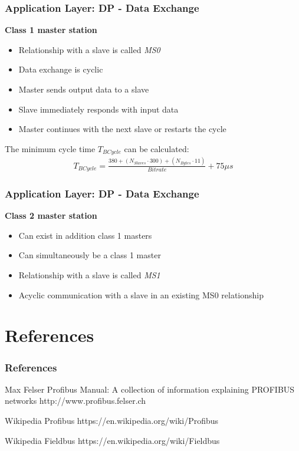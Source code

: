 \documentclass{beamer}
\begin{document}
\begin{frame}
  \frametitle{Application Layer: DP - Data Exchange}
  \textbf{Class 1 master station}
  \begin{itemize}
    \item Relationship with a slave is called \textit{MS0}
    \item Data exchange is cyclic
    \item Master sends output data to a slave
    \item Slave immediately responds with input data
    \item Master continues with the next slave or restarts the cycle
  \end{itemize}
  \vspace{10pt}
  The minimum cycle time $T_{BCycle}$ can be calculated:
  \begin{align*}
    T_{BCycle} = \frac{380 + (N_{Slaves} \cdot 300) + (N_{Bytes} \cdot 11)}{Bitrate} + 75
    \mu s
    \label{minimumcycletime}
  \end{align*}
\end{frame}

\begin{frame}
  \frametitle{Application Layer: DP - Data Exchange}
  \textbf{Class 2 master station}
  \begin{itemize}
    \item Can exist in addition class 1 masters
    \item Can simultaneously be a class 1 master
    \item Relationship with a slave is called \textit{MS1}
    \item Acyclic communication with a slave in an existing MS0 relationship
  \end{itemize}
\end{frame}

\section*{References}
\begin{frame}[allowframebreaks]
  \frametitle{References}
  \begin{thebibliography}{10}
  \beamertemplatebookbibitems
    Max Felser
    \newblock Profibus Manual: A collection of information explaining PROFIBUS networks
    \newblock http://www.profibus.felser.ch

    Wikipedia
    \newblock Profibus
    \newblock https://en.wikipedia.org/wiki/Profibus

    Wikipedia
    \newblock Fieldbus
    \newblock https://en.wikipedia.org/wiki/Fieldbus
   \end{thebibliography}
 \end{frame}
\end{document}
